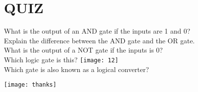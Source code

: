 \documentclass{article}
\begin{document}
\section{QUIZ}
What is the output of an AND gate if the inputs are 1 and 0?
\\
Explain the difference between the AND gate and the OR gate.\\
What is the output of a NOT gate if the inputs is 0?\\
Which logic gate is this?
\texttt{[image: 12]}\\
Which gate is also known as a logical converter?
\\
\newpage


\newpage
\texttt{[image: thanks]}
\end{document}
